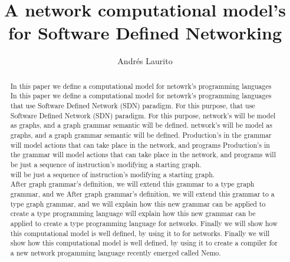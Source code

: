 \documentclass[envcountsect,runningheads]{llncs}
\title{A network computational model's for Software Defined Networking}
\author{Andr\'es Laurito}
\institute{
Departamento de Computac\'on - FCEN -UBA\\
 \email{andy.laurito@gmail.com} }
\begin{document}
\maketitle

\begin{abstract}
 In this paper we define a computational model for netowrk's programming languages 
 In this paper we define a computational model for netowrk's programming languages 
 that use Software Defined Network (SDN) paradigm. For this purpose, 
 that use Software Defined Network (SDN) paradigm. For this purpose, 
 network's will be model as graphs, and a graph grammar semantic will be defined. 
 network's will be model as graphs, and a graph grammar semantic will be defined. 
 Production's in the grammar will model actions that can take place in the network, and programs 
 Production's in the grammar will model actions that can take place in the network, and programs 
 will be just a sequence of instruction's modifying a starting graph. \\
 will be just a sequence of instruction's modifying a starting graph. \\
 After graph grammar's definition, we will extend this grammar to a type graph grammar, and we 
 After graph grammar's definition, we will extend this grammar to a type graph grammar, and we 
 will explain how this new grammar can be applied to create a type programming language 
 will explain how this new grammar can be applied to create a type programming language 
 for networks. Finally we will show how this computational model is well defined, by using it to 
 for networks. Finally we will show how this computational model is well defined, by using it to 
 create a compiler for a new network progamming language recently emerged called Nemo.
 \end{abstract}
\end{document}
